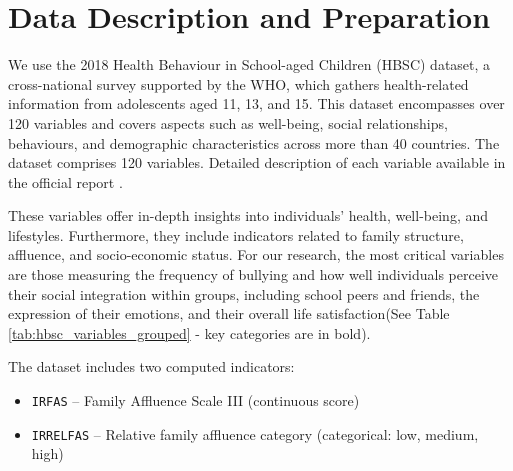 \documentclass[main.tex]{subfiles}
\begin{document}
\section{Data Description and Preparation}

We use the 2018 Health Behaviour in School-aged Children (HBSC) dataset, a cross-national survey supported by the WHO, which gathers health-related information from adolescents aged 11, 13, and 15. This dataset encompasses over 120 variables and covers aspects such as well-being, social relationships, behaviours, and demographic characteristics across more than 40 countries. The dataset comprises 120 variables. Detailed description of each variable available in the official report \cite{HBSC2018OA_ed1}. 

These variables offer in-depth insights into individuals' health, well-being, and lifestyles. Furthermore, they include indicators related to family structure, affluence, and socio-economic status. For our research, the most critical variables are those measuring the frequency of bullying and how well individuals perceive their social integration within groups, including school peers and friends, the expression of their emotions, and their overall life satisfaction(See Table \ref{tab:hbsc_variables_grouped}  - key categories are in bold).

The dataset includes two computed indicators:
\begin{itemize}
 \item \texttt{IRFAS} – Family Affluence Scale III (continuous score)
 \item \texttt{IRRELFAS} – Relative family affluence category (categorical: low, medium, high)
\end{itemize}
 
\end{document}

